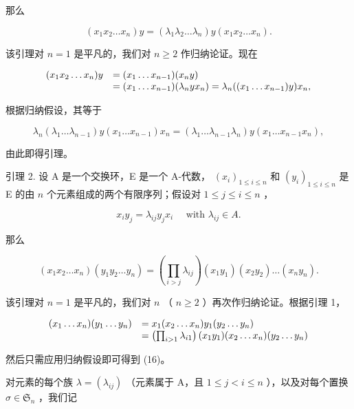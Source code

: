 那么

\[
\left(x _ {1} x _ {2} \dots x _ {n}\right) y = \left(\lambda_ {1} \lambda_ {2} \dots \lambda_ {n}\right) y \left(x _ {1} x _ {2} \dots x _ {n}\right).\tag{14}
\]

该引理对 \(n = 1\) 是平凡的，我们对 \(n \geqslant 2\) 作归纳论证。现在

\[
\begin{array}{r l} (x _ {1} x _ {2} \dots x _ {n}) y & = (x _ {1} \dots x _ {n - 1}) (x _ {n} y) \\ & = (x _ {1} \dots x _ {n - 1}) (\lambda_ {n} y x _ {n}) = \lambda_ {n} ((x _ {1} \dots x _ {n - 1}) y) x _ {n}, \end{array}
\]

根据归纳假设，其等于

\[
\lambda_ {n} \left(\lambda_ {1} \dots \lambda_ {n - 1}\right) y \left(x _ {1} \dots x _ {n - 1}\right) x _ {n} = \left(\lambda_ {1} \dots \lambda_ {n - 1} \lambda_ {n}\right) y \left(x _ {1} \dots x _ {n - 1} x _ {n}\right),
\]

由此即得引理。

引理 2. 设 A 是一个交换环，E 是一个 A-代数， \((x_{i})_{1\leqslant i\leqslant n}\) 和 \((y_{i})_{1\leqslant i\leqslant n}\) 是 E 的由 \(n\) 个元素组成的两个有限序列；假设对 \(1\leqslant j\leqslant i\leqslant n\) ，

\[
x _ {i} y _ {j} = \lambda_ {i j} y _ {j} x _ {i} \quad \text { with } \lambda_ {i j} \in A.\tag{15}
\]

那么

\[
\left(x _ {1} x _ {2} \dots x _ {n}\right) \left(y _ {1} y _ {2} \dots y _ {n}\right) = \left(\prod_ {i > j} \lambda_ {i j}\right) \left(x _ {1} y _ {1}\right) \left(x _ {2} y _ {2}\right) \dots \left(x _ {n} y _ {n}\right).\tag{16}
\]

该引理对 \(n = 1\) 是平凡的，我们对 \(n\) （ \(n \geqslant 2\) ）再次作归纳论证。根据引理 1，

\[
\begin{array}{r l} (x _ {1} \dots x _ {n}) (y _ {1} \dots y _ {n}) & = x _ {1} (x _ {2} \dots x _ {n}) y _ {1} (y _ {2} \dots y _ {n}) \\ & = \left(\prod_ {i > 1} \lambda_ {i 1}\right) (x _ {1} y _ {1}) (x _ {2} \dots x _ {n}) (y _ {2} \dots y _ {n}) \end{array}
\]

然后只需应用归纳假设即可得到 (16)。

对元素的每个族 \(\lambda = (\lambda_{ij})\) （元素属于 A，且 \(1 \leqslant j < i \leqslant n\) ），以及对每个置换 \(\sigma \in \mathfrak{S}_n\) ，我们记

